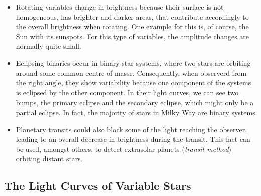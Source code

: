 \begin{itemize}
\item Rotating variables change in brightness because their surface is not homogeneous, \eg has brighter and darker areas, that contribute accordingly to the overall brightness when rotating. One example for this is, of course, the Sun with its sunspots. For this type of variables, the amplitude changes are normally quite small.
\item Eclipsing binaries occur in binary star systems, where two stars are orbiting around some common centre of masse. Consequently, when observerd from the right angle, they show variability because one component of the systems is eclipsed by the other component. In their light curves, we can see two bumps, the primary eclipse and the secondary eclipse, which might only be a partial eclipse. In fact, the majority of stars in Milky Way are binary systems.
\item Planetary transits could also block some of the light reaching the observer, leading to an overall decrease in brightness during the transit. This fact can be used, amongst others, to detect extrasolar planets (\emph{transit method}) orbiting distant stars.
\end{itemize}
 

\subsection{The Light Curves of Variable Stars}
\label{subsec:light-curves-variables}

